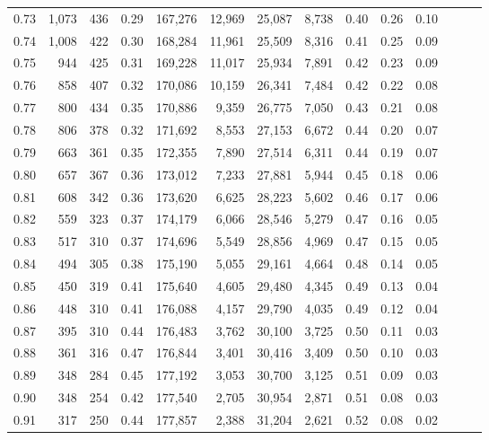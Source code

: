 \begin{tabular}{rrrrrrrrrrrrrr}
0.73 &  1,073 &  436 &  0.29 &  167,276 &   12,969 &  25,087 &   8,738 &  0.40 &  0.26 &      0.10 \\
0.74 &  1,008 &  422 &  0.30 &  168,284 &   11,961 &  25,509 &   8,316 &  0.41 &  0.25 &      0.09 \\
0.75 &    944 &  425 &  0.31 &  169,228 &   11,017 &  25,934 &   7,891 &  0.42 &  0.23 &      0.09 \\
0.76 &    858 &  407 &  0.32 &  170,086 &   10,159 &  26,341 &   7,484 &  0.42 &  0.22 &      0.08 \\
0.77 &    800 &  434 &  0.35 &  170,886 &    9,359 &  26,775 &   7,050 &  0.43 &  0.21 &      0.08 \\
0.78 &    806 &  378 &  0.32 &  171,692 &    8,553 &  27,153 &   6,672 &  0.44 &  0.20 &      0.07 \\
0.79 &    663 &  361 &  0.35 &  172,355 &    7,890 &  27,514 &   6,311 &  0.44 &  0.19 &      0.07 \\
0.80 &    657 &  367 &  0.36 &  173,012 &    7,233 &  27,881 &   5,944 &  0.45 &  0.18 &      0.06 \\
0.81 &    608 &  342 &  0.36 &  173,620 &    6,625 &  28,223 &   5,602 &  0.46 &  0.17 &      0.06 \\
0.82 &    559 &  323 &  0.37 &  174,179 &    6,066 &  28,546 &   5,279 &  0.47 &  0.16 &      0.05 \\
0.83 &    517 &  310 &  0.37 &  174,696 &    5,549 &  28,856 &   4,969 &  0.47 &  0.15 &      0.05 \\
0.84 &    494 &  305 &  0.38 &  175,190 &    5,055 &  29,161 &   4,664 &  0.48 &  0.14 &      0.05 \\
0.85 &    450 &  319 &  0.41 &  175,640 &    4,605 &  29,480 &   4,345 &  0.49 &  0.13 &      0.04 \\
0.86 &    448 &  310 &  0.41 &  176,088 &    4,157 &  29,790 &   4,035 &  0.49 &  0.12 &      0.04 \\
0.87 &    395 &  310 &  0.44 &  176,483 &    3,762 &  30,100 &   3,725 &  0.50 &  0.11 &      0.03 \\
0.88 &    361 &  316 &  0.47 &  176,844 &    3,401 &  30,416 &   3,409 &  0.50 &  0.10 &      0.03 \\
0.89 &    348 &  284 &  0.45 &  177,192 &    3,053 &  30,700 &   3,125 &  0.51 &  0.09 &      0.03 \\
0.90 &    348 &  254 &  0.42 &  177,540 &    2,705 &  30,954 &   2,871 &  0.51 &  0.08 &      0.03 \\
0.91 &    317 &  250 &  0.44 &  177,857 &    2,388 &  31,204 &   2,621 &  0.52 &  0.08 &      0.02 \\

\end{tabular}
